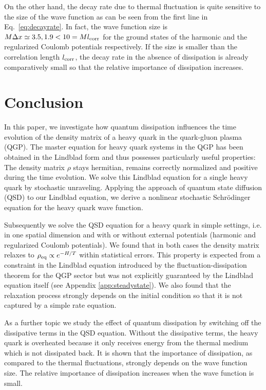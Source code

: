 \documentclass[prd,11pt, amsmath, amsymb, aps, reprint, tightenlines, nofootinbib, longbibliography, abbrv, preprintnumbers]{revtex4-1}
\begin{document}
On the other hand, the decay rate due to thermal fluctuation is quite sensitive to the size of the wave function as can be seen from the first line in Eq.~\eqref{eq:decayrate}.
In fact, the wave function size is $M\Delta x\simeq 3.5, 1.9 < 10=Ml_{\rm corr}$ for the ground states of the harmonic and the regularized Coulomb potentials respectively.
If the size is smaller than the correlation length $l_{\rm corr}$, the decay rate in the absence of dissipation is already comparatively small so that the relative importance of dissipation increases.

\section{Conclusion}
\label{sec:conclusion}
In this paper, we investigate how quantum dissipation influences the time evolution of the density matrix of a heavy quark in the quark-gluon plasma (QGP).
The master equation for heavy quark systems in the QGP has been obtained in the Lindblad form \cite{Akamatsu:2014qsa, lindblad1976generators} and thus possesses particularly useful properties: The density matrix $\rho$ stays hermitian, remains correctly normalized and positive during the time evolution.
We solve this Lindblad equation for a single heavy quark by stochastic unraveling.
Applying the approach of quantum state diffusion (QSD) \cite{gisin1992quantum} to our Lindblad equation, we derive a nonlinear stochastic Schr\"odinger equation for the heavy quark wave function.

Subsequently we solve the QSD equation for a heavy quark in simple settings, i.e. in one spatial dimension and with or without external potentials (harmonic and regularized Coulomb potentials).
We found that in both cases the density matrix relaxes to $\rho_{\rm eq}\propto e^{-H/T}$ within statistical errors.
This property is expected from a constraint in the Lindblad equation introduced by the fluctuation-dissipation theorem for the QGP sector but was not explicitly guaranteed by the Lindblad equation itself (see Appendix \ref{app:steadystate}).
We also found that the relaxation process strongly depends on the initial condition so that it is not captured by a simple rate equation.

As a further topic we study the effect of quantum dissipation by switching off the dissipative terms in the QSD equation.
Without the dissipative terms, the heavy quark is overheated because it only receives energy from the thermal medium which is not dissipated back.
It is shown that the importance of dissipation, as compared to the thermal fluctuations, strongly depends on the wave function size.
The relative importance of dissipation increases when the wave function is small.
\end{document}
